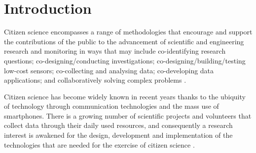 \documentclass[sigconf]{acmart}
\begin{document}



\maketitle

\section{Introduction}

Citizen science encompasses a range of methodologies that encourage and support the contributions of the public to the advancement of scientific and engineering research and monitoring in ways that may include co-identifying research questions; co-designing/conducting investigations; co-designing/building/testing low-cost sensors; co-collecting and analysing data; co-developing data applications; and collaboratively solving complex problems \cite{vohland_science_2021}.



Citizen science has become widely known in recent years thanks to the ubiquity of technology through communication technologies and the mass use of smartphones. There is a growing number of scientific projects and volunteers that collect data through their daily used resources, and consequently a research interest is awakened for the design, development and implementation of the technologies that are needed for the exercise of citizen science \cite{Preece2016}.
\end{document}
